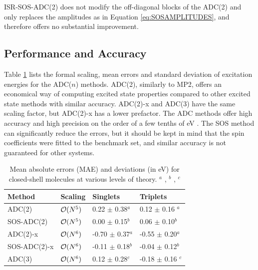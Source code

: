 ISR-SOS-ADC(2) does not modify the off-diagonal blocks of the ADC(2) and only replaces the amplitudes as in Equation \ref{eq:SOSAMPLITUDES}, and therefore offers no substantial improvement. 


\FloatBarrier

\subsection{Performance and Accuracy}

Table \ref{tab:ADCSTATS} lists the formal scaling, mean errors and standard deviation of excitation energies for the ADC($n$) methods. ADC(2), similarly to MP2, offers an economical way of computing excited state properties compared to other excited state methods with similar accuracy. ADC(2)-x and ADC(3) have the same scaling factor, but ADC(2)-x has a lower prefactor. The ADC methods offer high accuracy and high precision on the order of a few tenths of eV . The SOS method can significantly reduce the errors, but it should be kept in mind that the spin coefficients were fitted to the benchmark set, and similar accuracy is not guaranteed for other systems.

\begin{table}[h]
\centering
\begin{tabular}{llll}
\hline
Method & Scaling & Singlets & Triplets \\ \hline
ADC(2) & $\mathcal{O}(N^{5})$ & 0.22 $\pm$ 0.38$^a$ & 0.12 $\pm$ 0.16 $^a$ \\
SOS-ADC(2) & $\mathcal{O}(N^{5})$ & 0.00 $\pm$ 0.15$^b$ & 0.06 $\pm$ 0.10$^b$ \\
ADC(2)-x & $\mathcal{O}(N^{6})$ & -0.70 $\pm$ 0.37$^a$ & -0.55 $\pm$ 0.20$^a$ \\
SOS-ADC(2)-x & $\mathcal{O}(N^{6})$ & -0.11 $\pm$ 0.18$^b$ & -0.04 $\pm$ 0.12$^b$ \\
ADC(3) & $\mathcal{O}(N^{6})$ & 0.12 $\pm$ 0.28$^c$ & -0.18 $\pm$ 0.16 $^c$ \\ \hline  
\end{tabular}
\caption[Mean absolute errors (MAE) and deviations (in eV) for closed-shell molecules at various levels of theory.]{Mean absolute errors (MAE) and deviations (in eV) for closed-shell molecules at various levels of theory. $^a$ \cite{Har2014}, $^b$ \cite{Kra2013}, $^c$ \cite{Tro2006}}
\label{tab:ADCSTATS}
\end{table}

